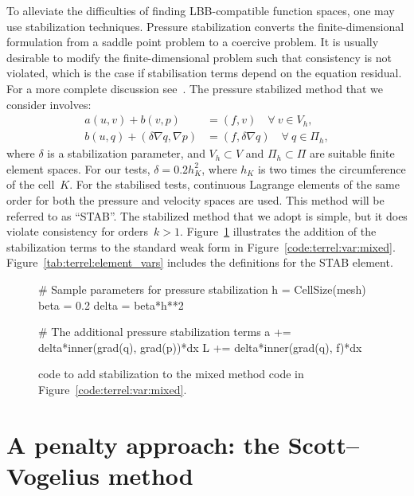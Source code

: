 To alleviate the difficulties of finding LBB-compatible function spaces,
one may use stabilization techniques.  Pressure stabilization converts the
finite-dimensional formulation from a saddle point problem to a coercive
problem. It is usually desirable to modify the finite-dimensional problem
such that consistency is not violated, which is the case if stabilisation
terms depend on the equation residual. For a more complete discussion
see~\citet{DoneaHuerta2003}.  The pressure stabilized method that we
consider involves:
%
\begin{align}
  a(u, v) + b(v, p)
      &=  (f, v) \quad \forall \ v \in V_{h},
\\
  b(u, q) +  (\delta\nabla{q},\nabla{p}) &=   (f, \delta \nabla q)
\quad \forall \ q \in \Pi_{h},
\end{align}
%
where $\delta$ is a stabilization parameter, and $V_{h} \subset V$
and $\Pi_{h} \subset \Pi$ are suitable finite element spaces. For
our tests, $\delta = 0.2 h_{K}^{2}$, where $h_{K}$ is two times
the circumference of the cell~$K$.
For the stabilised tests,
continuous Lagrange elements of the same order for both the pressure
and velocity spaces are used. This method will be referred to
as ``STAB''. The stabilized method that we adopt is simple, but it
does violate consistency for orders~$k > 1$.
Figure~\ref{code:terrel:var:stab} illustrates the
addition of the stabilization terms to the standard weak form in
Figure~\ref{code:terrel:var:mixed}.  Figure~\ref{tab:terrel:element_vars}
includes the definitions for the STAB element.

\begin{figure}
\begin{python}
# Sample parameters for pressure stabilization
h = CellSize(mesh)
beta = 0.2
delta = beta*h**2

# The additional pressure stabilization terms
a += delta*inner(grad(q), grad(p))*dx
L += delta*inner(grad(q), f)*dx
\end{python}
\caption{\ufl{} code to add stabilization to the mixed method
code in Figure~\ref{code:terrel:var:mixed}.}
\label{code:terrel:var:stab}
\end{figure}
\section{A penalty approach: the Scott--Vogelius method}

